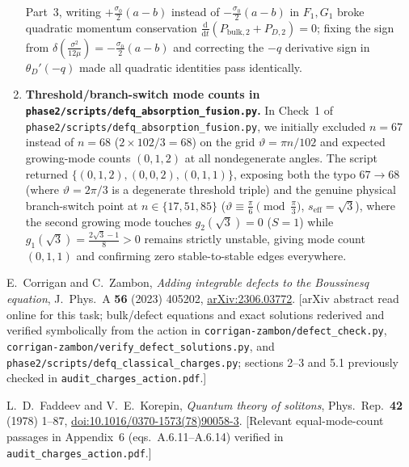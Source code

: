 \documentclass[11pt,a4paper]{article}
\newcommand{\dd}{\mathrm{d}}
\newcommand{\sclass}{\texttt{phase2/\allowbreak scripts/\allowbreak defq\_\allowbreak classical\_\allowbreak charges.py}}
\newcommand{\sfus}{\texttt{phase2/\allowbreak scripts/\allowbreak defq\_\allowbreak absorption\_\allowbreak fusion.py}}
\theoremstyle{remark}
\begin{document}
\begin{enumerate}
Part~3, writing $+\frac{\sigma_0}{2}(a-b)$ instead of $-\frac{\sigma_0}{2}(a-b)$
in $F_1,G_1$ broke quadratic momentum conservation $\frac{\dd}{\dd t}(P_{\mathrm{bulk},2}+P_{D,2})=0$;
fixing the sign from $\delta(\frac{\sigma^2}{12\mu}) = -\frac{\sigma_0}{2}(a-b)$
and correcting the $-q$ derivative sign in $\theta_D'(-q)$ made all quadratic
identities pass identically.
\item \textbf{Threshold/branch-switch mode counts in \sfus.}
In Check~1 of \sfus, we initially excluded
$n=67$ instead of $n=68$ ($2\times 102/3 = 68$) on the grid $\vartheta = \pi n/102$
and expected growing-mode counts $(0,1,2)$ at all nondegenerate angles. The
script returned $\{(0,1,2),(0,0,2),(0,1,1)\}$, exposing both the typo $67\to 68$
(where $\vartheta=2\pi/3$ is a degenerate threshold triple) and the genuine physical
branch-switch point at $n \in \{17,51,85\}$ ($\vartheta \equiv \frac{\pi}{6}\pmod{\frac{\pi}{3}}$,
$s_{\mathrm{eff}}=\sqrt{3}$), where the second growing mode touches $g_2(\sqrt{3})=0$
($S=1$) while $g_1(\sqrt{3}) = \frac{2\sqrt{3}-1}{8} > 0$ remains strictly unstable,
giving mode count $(0,1,1)$ and confirming zero stable-to-stable edges everywhere.
\end{enumerate}

\begin{thebibliography}{9}\small
{}
E.~Corrigan and C.~Zambon,
\emph{Adding integrable defects to the Boussinesq equation},
J.~Phys.~A \textbf{56} (2023) 405202,
\href{https://arxiv.org/abs/2306.03772}{arXiv:2306.03772}.
[arXiv abstract read online for this task; bulk/defect equations and exact
solutions rederived and verified symbolically from the action in
\texttt{corrigan-zambon/defect\_check.py},
\texttt{corrigan-zambon/verify\_defect\_solutions.py}, and
\sclass; sections 2--3 and 5.1 previously checked in
\texttt{audit\_charges\_action.pdf}.]

L.~D.~Faddeev and V.~E.~Korepin,
\emph{Quantum theory of solitons},
Phys.~Rep.\ \textbf{42} (1978) 1--87,
\href{https://doi.org/10.1016/0370-1573(78)90058-3}{doi:10.1016/0370-1573(78)90058-3}.
[Relevant equal-mode-count passages in Appendix~6 (eqs.~A.6.11--A.6.14) verified
in \texttt{audit\_charges\_action.pdf}.]
\end{thebibliography}
\end{document}
